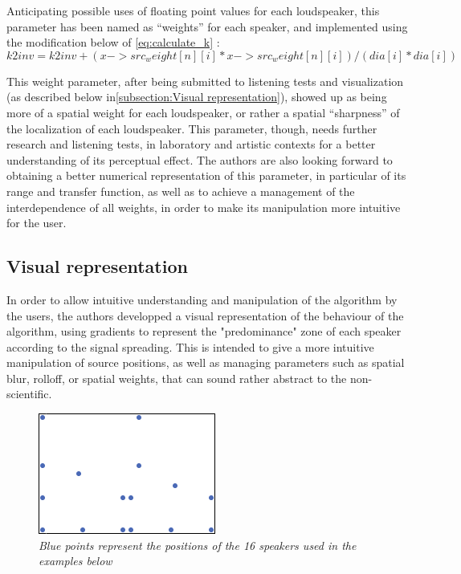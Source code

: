 \documentclass[twoside,10pt]{article}
\begin{document}
Anticipating possible uses of floating point values for each loudspeaker, this parameter has been named as ``weights'' for each speaker, and implemented using the modification below of \ref{eq:calculate_k} :
\begin{equation} \label{eq:2Dweight}
k2inv = k2inv + (x->src_weight[n][i]*x->src_weight[n][i])/(dia[i]*dia[i])
\end{equation}

This weight parameter, after being submitted to listening tests and visualization (as described below in\ref{subsection:Visual representation}), showed up as being more of a spatial weight for each loudspeaker, or rather a spatial ``sharpness'' of the localization of each loudspeaker. This parameter, though, needs further research and listening tests, in laboratory and artistic contexts for a better understanding of its perceptual effect.
The authors are also looking forward to obtaining a better numerical representation of this parameter, in particular of its range and transfer function, as well as to achieve a management of the interdependence of all weights, in order to make its manipulation more intuitive for the user.

\subsection{Visual representation}

In order to allow intuitive understanding and manipulation of the algorithm by the users, the authors developped a visual representation of the behaviour of the algorithm, using gradients to represent the "predominance" zone of each speaker according to the signal spreading. This is intended to give a more intuitive manipulation of source positions, as well as managing parameters such as spatial blur, rolloff, or spatial weights, that can sound rather abstract to the non-scientific.

\begin{figure}[ht]
\centerline{\includegraphics[scale=0.8]{LoudspeakerPositions}}
\caption{{\it Blue points represent the positions of the 16 speakers used in the examples below}}  
\label{Speakers Positions}
\end{figure}
\end{document}
